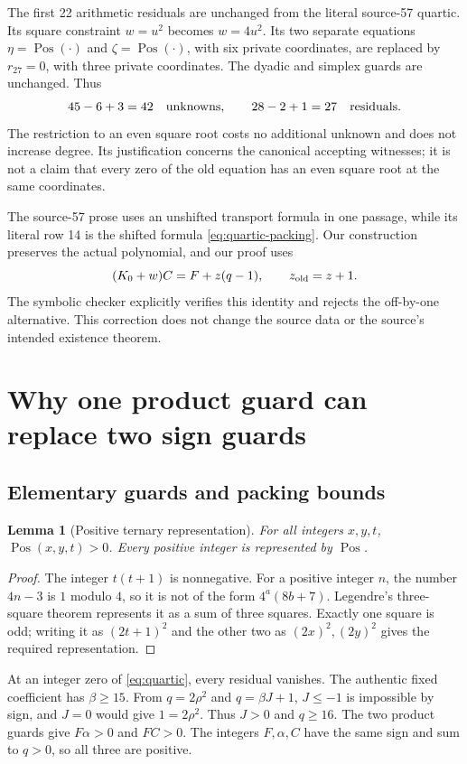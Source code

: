 \documentclass[11pt,a4paper]{article}
\newtheorem{lemma}[theorem]{Lemma}
\theoremstyle{remark}\newtheorem{remark}[theorem]{Remark}
\newcommand{\Pos}{\operatorname{Pos}}
\begin{document}
The first 22 arithmetic residuals are unchanged from the literal source-57
quartic. Its square constraint $w=u^2$ becomes $w=4u^2$. Its two separate
equations $\eta=\Pos(\cdot)$ and $\zeta=\Pos(\cdot)$, with six private
coordinates, are replaced by $r_{27}=0$, with three private coordinates.
The dyadic and simplex guards are unchanged. Thus
\[
 45-6+3=42\quad\hbox{unknowns},\qquad 28-2+1=27\quad\hbox{residuals}.
\]
The restriction to an even square root costs no additional unknown and
does not increase degree. Its justification concerns the canonical
accepting witnesses; it is not a claim that every zero of the old equation
has an even square root at the same coordinates.

The source-57 prose uses an unshifted transport formula in one passage,
while its literal row 14 is the shifted formula \eqref{eq:quartic-packing}.
Our construction preserves the actual polynomial, and our proof uses
\[
 (K_0+w)C=F+z(q-1),\qquad z_{\rm old}=z+1.
\]
The symbolic checker explicitly verifies this identity and rejects the
off-by-one alternative. This correction does not change the source data
or the source's intended existence theorem.

\section{Why one product guard can replace two sign guards}
\label{sec:sign}

\subsection{Elementary guards and packing bounds}

\begin{lemma}[Positive ternary representation]
For all integers $x,y,t$, $\Pos(x,y,t)>0$. Every positive integer is
represented by $\Pos$.
\end{lemma}
\begin{proof}
The integer $t(t+1)$ is nonnegative. For a positive integer $n$, the number
$4n-3$ is $1$ modulo $4$, so it is not of the form $4^a(8b+7)$.
Legendre's three-square theorem represents it as a sum of three squares.
Exactly one square is odd; writing it as $(2t+1)^2$ and the other two
as $(2x)^2,(2y)^2$ gives the required representation.
\end{proof}

At an integer zero of \eqref{eq:quartic}, every residual vanishes.
The authentic fixed coefficient has $\beta\ge15$. From $q=2\rho^2$
and $q=\beta J+1$, $J\le-1$ is impossible by sign, and $J=0$ would
give $1=2\rho^2$. Thus $J>0$ and $q\ge16$.
The two product guards give $F\alpha>0$ and $FC>0$. The integers
$F,\alpha,C$ have the same sign and sum to $q>0$, so all three are
positive.
\end{document}
